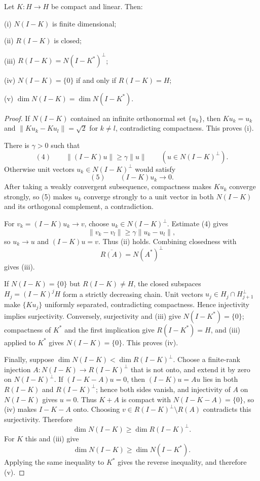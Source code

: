 \begin{theorem}
\label{thm:fredholm-alternative}

Let $K:H\to H$ be compact and linear. Then:

(i) $N(I-K)$ is finite dimensional;

(ii) $R(I-K)$ is closed;

(iii) $R(I-K)=N(I-K^*)^\perp$;

(iv) $N(I-K)=\{0\}$ if and only if $R(I-K)=H$;

(v) $\dim N(I-K)=\dim N(I-K^*)$.
\end{theorem}
\begin{proof}
\sketch If $N(I-K)$ contained an infinite orthonormal set $\{u_k\}$, then $Ku_k=u_k$ and $\|Ku_k-Ku_l\|=\sqrt2$ for $k\ne l$, contradicting compactness. This proves (i).

There is $\gamma>0$ such that
\[
(4)\qquad
\|(I-K)u\|\geq\gamma\|u\|
\qquad(u\in N(I-K)^\perp).
\]
Otherwise unit vectors $u_k\in N(I-K)^\perp$ would satisfy
\[
(5)\qquad (I-K)u_k\to0.
\]
After taking a weakly convergent subsequence, compactness makes $Ku_k$ converge strongly, so (5) makes $u_k$ converge strongly to a unit vector in both $N(I-K)$ and its orthogonal complement, a contradiction.

For $v_k=(I-K)u_k\to v$, choose $u_k\in N(I-K)^\perp$. Estimate (4) gives
\[
\|v_k-v_l\|\geq\gamma\|u_k-u_l\|,
\]
so $u_k\to u$ and $(I-K)u=v$. Thus (ii) holds. Combining closedness with
\[
\overline{R(A)}=N(A^*)^\perp
\]
gives (iii).

If $N(I-K)=\{0\}$ but $R(I-K)\ne H$, the closed subspaces $H_j=(I-K)^jH$ form a strictly decreasing chain. Unit vectors $u_j\in H_j\cap H_{j+1}^\perp$ make $\{Ku_j\}$ uniformly separated, contradicting compactness. Hence injectivity implies surjectivity. Conversely, surjectivity and (iii) give $N(I-K^*)=\{0\}$; compactness of $K^*$ and the first implication give $R(I-K^*)=H$, and (iii) applied to $K^*$ gives $N(I-K)=\{0\}$. This proves (iv).

Finally, suppose $\dim N(I-K)<\dim R(I-K)^\perp$. Choose a finite-rank injection $A:N(I-K)\to R(I-K)^\perp$ that is not onto, and extend it by zero on $N(I-K)^\perp$. If $(I-K-A)u=0$, then $(I-K)u=Au$ lies in both $R(I-K)$ and $R(I-K)^\perp$; hence both sides vanish, and injectivity of $A$ on $N(I-K)$ gives $u=0$. Thus $K+A$ is compact with $N(I-K-A)=\{0\}$, so (iv) makes $I-K-A$ onto. Choosing $v\in R(I-K)^\perp\setminus R(A)$ contradicts this surjectivity. Therefore
\[
\dim N(I-K)\geq\dim R(I-K)^\perp.
\]
For $K$ this and (iii) give
\[
\dim N(I-K)\geq\dim N(I-K^*).
\]
Applying the same inequality to $K^*$ gives the reverse inequality, and therefore (v).
\end{proof}

